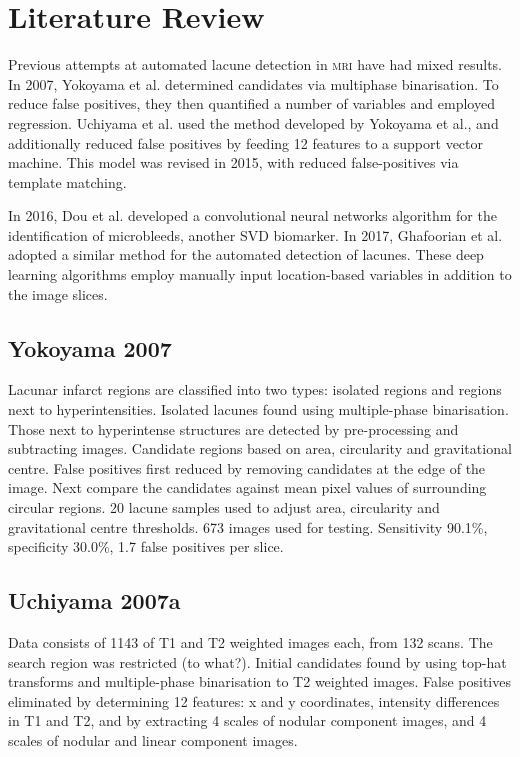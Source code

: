 


\chapter{Literature Review}\label{litrev-intro}

Previous attempts at automated lacune detection in \textsc{mri} have had mixed results. In 2007, Yokoyama et al. \cite{Yokoyama2007} determined candidates via multiphase binarisation. To reduce false positives, they then quantified a number of variables and employed regression. Uchiyama et al. \cite{Uchiyama20071554} used the method developed by Yokoyama et al., and additionally reduced false positives by feeding 12 features to a support vector machine. This model was revised in 2015\cite{Uchiyama2015}, with reduced false-positives via template matching.

In 2016, Dou et al. \cite{DouQ.2016ADoC} developed a convolutional neural networks algorithm for the identification of microbleeds, another SVD biomarker. In 2017, Ghafoorian et al. \cite{GhafoorianM.2017Dml3} adopted a similar method for the automated detection of lacunes. These deep learning algorithms employ manually input location-based variables in addition to the image slices.

\section{Yokoyama 2007}

Lacunar infarct regions are classified into two types: isolated regions and regions next to hyperintensities. Isolated lacunes found using multiple-phase binarisation. Those next to hyperintense structures are detected by pre-processing and subtracting images. Candidate regions based on area, circularity and gravitational centre. False positives first reduced by removing candidates at the edge of the image. Next compare the candidates against mean pixel values of surrounding circular regions.
20 lacune samples used to adjust area, circularity and gravitational centre thresholds. 673 images used for testing. Sensitivity 90.1\%, specificity 30.0\%, 1.7 false positives per slice.

\section{Uchiyama 2007a}

Data consists of 1143 of T1 and T2 weighted images each, from 132 scans. The search region was restricted (to what?). Initial candidates found by using top-hat transforms and multiple-phase binarisation to T2 weighted images. False positives eliminated by determining 12 features: x and y coordinates, intensity differences in T1 and T2, and by extracting 4 scales of nodular component images, and 4 scales of nodular and linear component images.

